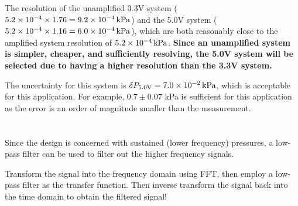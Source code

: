 The resolution of the unamplified 3.3V system ($5.2\times 10^{-4} \times 1.76 = \qty{9.2E-4}{\kilo\pascal}$) and the 5.0V system 
($5.2\times 10^{-4} \times 1.16 = \qty{6.0E-4}{\kilo\pascal}$), which are both reasonably close to the amplified system resolution of 
$\qty{5.2E-4}{\kilo\pascal}$. \textbf{Since an unamplified system is simpler, cheaper, and sufficiently resolving, the 5.0V system will be selected 
due to having a higher resolution than the 3.3V system.}

The uncertainty for this system is $\delta P_{5.0\text{V}} = \qty{7.0E-2}{\kilo\pascal}$, which is acceptable for this application.
For example, $0.7 \pm 0.07$ kPa is sufficient for this application as the error is an order of magnitude smaller than the measurement.

\section{}
Since the design is concerned with sustained (lower frequency) pressures, a low-pass filter can be used to filter out the higher frequency
signals. 

Transform the signal into the frequency domain using FFT, then employ a low-pass filter as the transfer function. Then 
inverse transform the signal back into the time domain to obtain the filtered signal!

